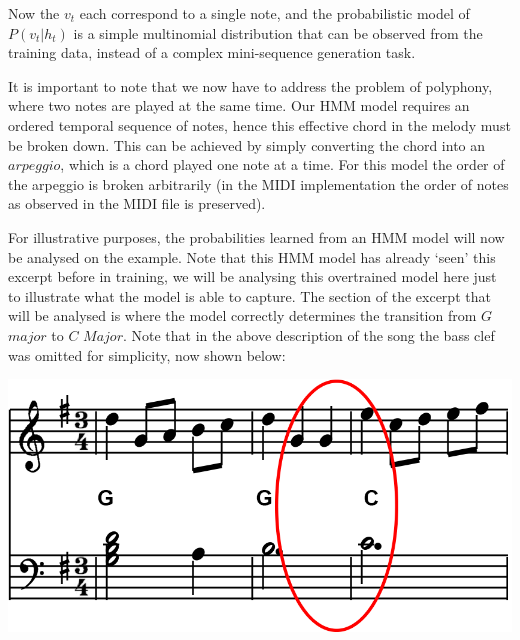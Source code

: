 \documentclass[bsc,singlespacing,logo, parskip, deptreport]{infthesis}
\begin{document}
\begin{center}
  {%
\parindent 0pt
\noindent
\ifx\preLilyPondExample \undefined
\else
  \expandafter\preLilyPondExample
\fi
\def\lilypondbook{}%

\ifx\postLilyPondExample \undefined
\else
  \expandafter\postLilyPondExample
\fi
}
\end{center}

Now the $v_t$ each correspond to a single note, and the probabilistic model of $P(v_t | h_t)$ is a simple multinomial distribution that can be observed from the training data, instead of a complex mini-sequence generation task.

It is important to note that we now have to address the problem of polyphony, where two notes are played at the same time. Our HMM model requires an ordered temporal sequence of notes, hence this effective chord in the melody must be broken down. This can be achieved by simply converting the chord into an $arpeggio$, which is a chord played one note at a time. For this model the order of the arpeggio is broken arbitrarily (in the MIDI implementation the order of notes as observed in the MIDI file is preserved).

For illustrative purposes, the probabilities learned from an HMM model will now be analysed on the example. Note that this HMM model has already `seen' this excerpt before in training, we will be analysing this overtrained model here just to illustrate what the model is able to capture. The section of the excerpt that will be analysed is where the model correctly determines the transition from $G$ $major$ to $C$ $Major$. Note that in the above description of the song the bass clef was omitted for simplicity, now shown below:

\begin{center}
  \includegraphics[scale=0.5]{ming.png}
\end{center}
\end{document}
